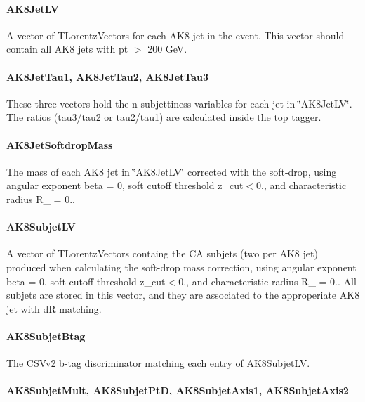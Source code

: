 \paragraph*{A\-K8\-Jet\-L\-V}

A vector of T\-Lorentz\-Vectors for each A\-K8 jet in the event. This vector should contain all A\-K8 jets with pt $>$ 200 Ge\-V.

\paragraph*{A\-K8\-Jet\-Tau1, A\-K8\-Jet\-Tau2, A\-K8\-Jet\-Tau3}

These three vectors hold the n-\/subjettiness variables for each jet in \char`\"{}\-A\-K8\-Jet\-L\-V\char`\"{}. The ratios (tau3/tau2 or tau2/tau1) are calculated inside the top tagger.

\paragraph*{A\-K8\-Jet\-Softdrop\-Mass}

The mass of each A\-K8 jet in \char`\"{}\-A\-K8\-Jet\-L\-V\char`\"{} corrected with the soft-\/drop, using angular exponent beta = 0, soft cutoff threshold z\-\_\-cut$<$0., and characteristic radius R\-\_ = 0..

\paragraph*{A\-K8\-Subjet\-L\-V}

A vector of T\-Lorentz\-Vectors containg the C\-A subjets (two per A\-K8 jet) produced when calculating the soft-\/drop mass correction, using angular exponent beta = 0, soft cutoff threshold z\-\_\-cut$<$0., and characteristic radius R\-\_ = 0.. All subjets are stored in this vector, and they are associated to the approperiate A\-K8 jet with d\-R matching.

\paragraph*{A\-K8\-Subjet\-Btag}

The C\-S\-Vv2 b-\/tag discriminator matching each entry of A\-K8\-Subjet\-L\-V.

\paragraph*{A\-K8\-Subjet\-Mult, A\-K8\-Subjet\-Pt\-D, A\-K8\-Subjet\-Axis1, A\-K8\-Subjet\-Axis2}

